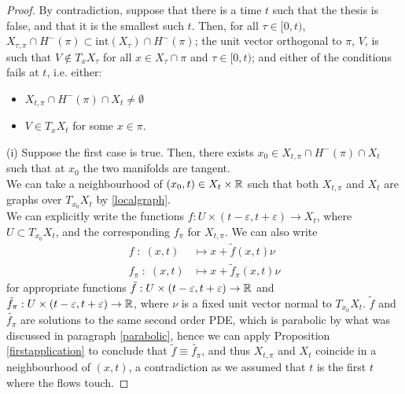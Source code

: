 \begin{proof}
	By contradiction, suppose that there is a time $t$ such that the thesis is false, and that it is the smallest such $t$. Then, for all $\tau \in [0,t)$, $X_{\tau,\pi}\cap H^-(\pi)\subset \mathrm{int}(X_{\tau})\cap H^-(\pi)$; the unit vector orthogonal to $\pi$, $V$, is such that $V\notin T_xX_\tau$ for all $x\in X_\tau\cap \pi$ and $\tau \in [0,t)$; and either of the conditions fails at $t$, i.e. either: 
	\begin{itemize}
		\item[(i)] $X_{t,\pi}\cap H^-(\pi)\cap X_{t}\neq \emptyset$
		\item[(ii)] $V\in T_xX_t$  for some $x\in\pi$. 
	\end{itemize} 
	
	(i) Suppose the first case is true. Then, there exists $x_0 \in X_{t,\pi}\cap H^-(\pi)\cap X_{t}$ such that at $x_0$ the two manifolds are tangent. \\
	We can take a neighbourhood of $(x_0, t)\in X_{t}\times \mathbb{R}$ such that  both $X_{t,\pi}$ and $X_{t}$ are graphs over $T_{x_0}X_{t}$ by \ref{localgraph}. \\
	We can explicitly write the functions $f:U\times (t-\varepsilon, t+\varepsilon)\rightarrow X_t$, where $U\subset T_{x_0}X_{t}$, and the corresponding $f_\pi$ for $X_{t,\pi}$. 
	We can also write 
	\begin{align*}
		f \; : \; (x, t) &\mapsto x+\tilde{f}(x, t)\nu \\
		f_\pi \; : \; (x, t) &\mapsto x+\tilde{f}_\pi(x, t)\nu 
	\end{align*}
	for appropriate functions $\tilde{f}:U\times (t-\varepsilon, t+\varepsilon)\rightarrow \mathbb{R}$ and $\tilde{f}_\pi:U\times (t-\varepsilon, t+\varepsilon)\rightarrow \mathbb{R}$, where $\nu$ is a fixed unit vector normal to $T_{x_0}X_{t}$.  $\tilde{f}$ and $\tilde{f_\pi}$ are solutions to the same second order PDE, which is parabolic by what was discussed in paragraph \ref{parabolic}, hence we can apply Proposition \ref{firstapplication} to conclude that $\tilde{f}\equiv\tilde{f_\pi}$, and thus $X_{t,\pi}$ and $X_{t}$ coincide in a neighbourhood of $(x, t)$, a contradiction as we assumed that $t$ is the first $t$ where the flows touch.
	

\end{proof}
